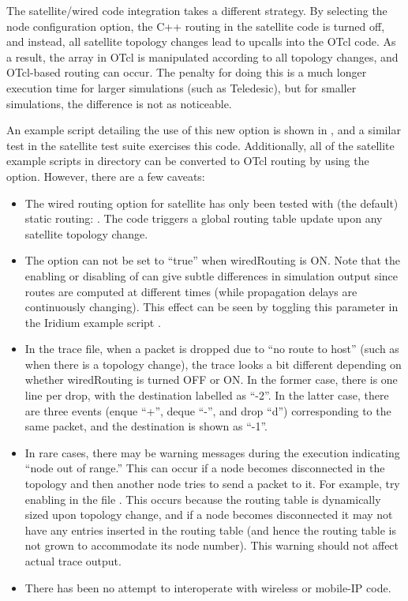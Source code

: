 The satellite/wired code integration takes a different strategy.  By
selecting the node configuration
 option, the C++
routing in the satellite code is turned off, and instead, all satellite 
topology changes lead to upcalls into the OTcl code.  As a result, 
the  array in OTcl is manipulated according to all topology 
changes, and OTcl-based routing can occur.  The penalty for doing this 
is a much longer execution time for larger simulations (such as Teledesic), 
but for smaller simulations, the difference is not as noticeable.

An example script detailing the use of this new option is shown in
, and a similar test in the satellite test suite
exercises this code.  Additionally, all of the satellite example scripts
in  directory can be converted to OTcl routing by using the 
 option.  However, there are a
few caveats: 
\begin{itemize}
\item The wired routing option for satellite has only been tested with
(the default) static routing: .  The code triggers
a global routing table update upon any satellite topology change.
\item The option 
can not be set to ``true'' when wiredRouting is ON.  Note that the enabling
or disabling of   can give subtle differences 
in simulation output since routes are computed at different times (while
propagation delays are continuously changing).  This effect can be seen
by toggling this parameter in the Iridium example 
script .
\item In the trace file, when a packet is dropped due to ``no route to
host'' (such as when there is a topology change), the trace looks a bit
different depending on whether wiredRouting is turned OFF or ON.  In the
former case, there is one line per drop, with the destination labelled
as ``-2''.  In the latter case, there are three events (enque ``+'', 
deque ``-'', and drop ``d'') corresponding to the same packet, and the
destination is shown as ``-1''.  
\item In rare cases, there may be warning messages during the execution
indicating ``node out of range.''  This can occur if a node becomes
disconnected in the topology and then another node tries to send a packet
to it.  For example, try enabling  in the file
.  This occurs because the routing table is
dynamically sized upon topology change, and if a node becomes disconnected  
it may not have any entries inserted in the routing table (and hence
the routing table is not grown to accommodate its node number).  This
warning should not affect actual trace output.
\item There has been no attempt to interoperate with wireless or 
mobile-IP code.
\end{itemize}
 

